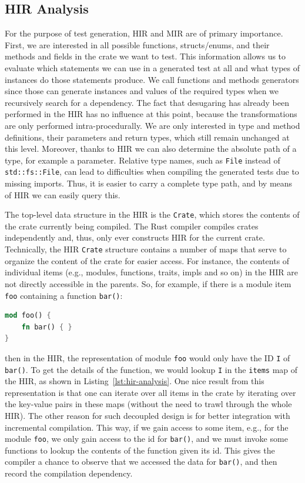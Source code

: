 \documentclass{article}
\begin{document}
\subsection{HIR Analysis}
For the purpose of test generation, \ac{HIR} and \ac{MIR} are of primary importance. First, we are interested in all possible functions, structs/enums, and their methods and fields in the crate we want to test. This information allows us to evaluate which statements we can use in a generated test at all and what types of instances do those statements produce. We call functions and methods generators since those can generate instances and values of the required types when we recursively search for a dependency. The fact that desugaring has already been performed in the \ac{HIR} has no influence at this point, because the transformations are only performed intra-procedurally. We are only interested in type and method definitions, their parameters and return types, which still remain unchanged at this level. Moreover, thanks to \ac{HIR} we can also determine the absolute path of a type, for example a parameter. Relative type names, such as \lstinline{File} instead of \lstinline{std::fs::File}, can lead to difficulties when compiling the generated tests due to missing imports. Thus, it is easier to carry a complete type path, and by means of \ac{HIR} we can easily query this.

The top-level data structure in the \ac{HIR} is the \lstinline{Crate}, which stores the contents of the crate currently being compiled. The Rust compiler compiles crates independently and, thus, only ever constructs \ac{HIR} for the current crate. Technically, the \ac{HIR} \lstinline{Crate} structure contains a number of maps that serve to organize the content of the crate for easier access. For instance, the contents of individual items (e.g., modules, functions, traits, impls and so on) in the \ac{HIR} are not directly accessible in the parents. So, for example, if there is a module item \lstinline{foo} containing a function \lstinline{bar()}:

\begin{lstlisting}[language=Rust, style=boxed, caption={}]
mod foo() {
    fn bar() { }
}
\end{lstlisting}
then in the \ac{HIR}, the representation of module \lstinline{foo} would only have the ID \lstinline{I} of \lstinline{bar()}. To get the details of the function, we would lookup \lstinline{I} in the \lstinline{items} map of the \ac{HIR}, as shown in Listing~\ref{lst:hir-analysis}. One nice result from this representation is that one can iterate over all items in the crate by iterating over the key-value pairs in these maps (without the need to trawl through the whole \ac{HIR}). The other reason for such decoupled design is for better integration with incremental compilation. This way, if we gain access to some item, e.g., for the module \lstinline{foo}, we only gain access to the id for \lstinline{bar()}, and we must invoke some functions to lookup the contents of the function given its id. This gives the compiler a chance to observe that we accessed the data for \lstinline{bar()}, and then record the compilation dependency.
\end{document}
